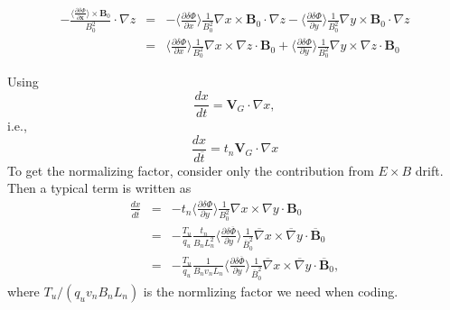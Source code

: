 \documentclass{article}
\begin{document}
\begin{eqnarray}
  - \frac{\langle \frac{\partial \delta \Phi}{\partial \mathbf{x}} \rangle
  \times \mathbf{B}_0}{B_0^2} \cdot \nabla z & = & - \langle \frac{\partial
  \delta \Phi}{\partial x} \rangle \frac{1}{B_0^2} \nabla x \times
  \mathbf{B}_0 \cdot \nabla z - \langle \frac{\partial \delta \Phi}{\partial
  y} \rangle \frac{1}{B_0^2} \nabla y \times \mathbf{B}_0 \cdot \nabla z
  \nonumber\\
  & = & \langle \frac{\partial \delta \Phi}{\partial x} \rangle
  \frac{1}{B_0^2} \nabla x \times \nabla z \cdot \mathbf{B}_0 + \langle
  \frac{\partial \delta \Phi}{\partial y} \rangle \frac{1}{B_0^2} \nabla y
  \times \nabla z \cdot \mathbf{B}_0 
\end{eqnarray}


Using
\begin{equation}
  \frac{d x}{d t} =\mathbf{V}_G \cdot \nabla x,
\end{equation}
i.e.,
\begin{equation}
  \frac{d x}{d \overline{t}} = t_n \mathbf{V}_G \cdot \nabla x
\end{equation}
To get the normalizing factor, consider only the contribution from $E \times
B$ drift. Then a typical term is written as
\begin{eqnarray}
  \frac{d x}{d \overline{t}} & = & - t_n \langle \frac{\partial \delta
  \Phi}{\partial y} \rangle \frac{1}{B_0^2} \nabla x \times \nabla y \cdot
  \mathbf{B}_0 \nonumber\\
  & = & - \frac{T_u}{q_u} \frac{t_n}{B_n L_n^2} \langle \frac{\partial \delta
  \overline{\Phi}}{\partial y} \rangle \frac{1}{\overline{B}_0^2}
  \overline{\nabla} x \times \overline{\nabla} y \cdot \overline{\mathbf{B}}_0
  \nonumber\\
  & = & - \frac{T_u}{q_u} \frac{1}{B_n v_n L_n} \langle \frac{\partial \delta
  \overline{\Phi}}{\partial y} \rangle \frac{1}{\overline{B}_0^2}
  \overline{\nabla} x \times \overline{\nabla} y \cdot
  \overline{\mathbf{B}}_0, 
\end{eqnarray}
where $T_u / (q_u v_n B_n L_n)$ is the normlizing factor we need when coding.
\end{document}
